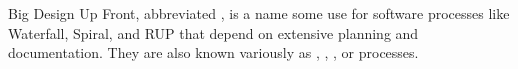 \begin{sidebar}[-0.50in]{Big Design Up Front}, abbreviated , is a name some use for software processes like
  Waterfall, Spiral, and RUP that depend on extensive planning and
  documentation. They are also known variously as ,
  , , or  processes.
  \protect{}%
  \protect{}%
  \protect{}%
  \protect{}%
  \protect{}%
\end{sidebar}